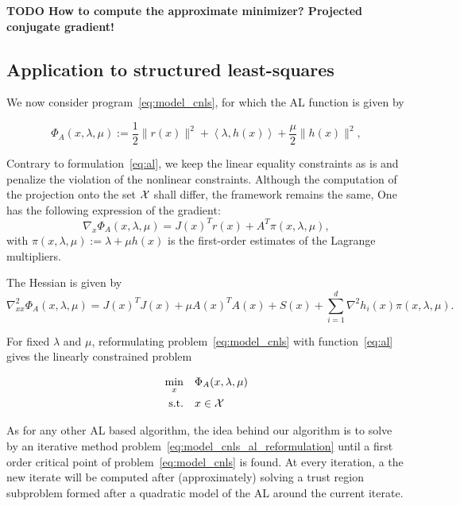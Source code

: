 \documentclass[10pt]{article}
\numberwithin{equation}{section}
\newcommand{\scal}[2]{\left\langle {#1} , {#2} \right\rangle} %
\begin{document}
	 \textbf{TODO How to compute the approximate minimizer? Projected conjugate gradient!}
	 \subsection{Application to structured least-squares}
	 
	 We now consider program~\eqref{eq:model_cnls}, for which the AL function is given by
	 
	 \begin{equation}
	 	\label{eq:lsal}
	 	\Phi_A(x,\lambda,\mu) := \dfrac{1}{2}\|r(x)\|^2 + \scal{\lambda}{h(x)} + \dfrac{\mu}{2} \|h(x)\|^2,
	 \end{equation}
	 
	 Contrary to formulation~\eqref{eq:al}, we keep the linear equality constraints as is and penalize the violation of the nonlinear constraints. Although the computation of the projection onto the set ${\mathcal{X}}$ shall differ, the framework remains the same, 
	 One has the following expression of the gradient: 
	 \begin{equation}
	 	\label{eq:al_grad}
	 	\nabla_x \Phi_A(x,\lambda,\mu) = J(x)^Tr(x) + A^T\pi(x,\lambda,\mu),
	 \end{equation}
	 with $\pi(x,\lambda,\mu):=\lambda + \mu h(x)$ is the first-order estimates of the Lagrange multipliers. 
	 
	 The Hessian is given by
	 \begin{equation}\label{eq:al_hessian}
	 	\nabla^2_{xx} \Phi_A(x,\lambda,\mu) = J(x)^TJ(x) + \mu A(x)^TA(x) +  S(x) + \sum_{i=1}^d \nabla^2 h_i(x) \pi(x,\lambda,\mu).
	 \end{equation}
	 
	 For fixed $\lambda$ and $\mu$, reformulating problem~\eqref{eq:model_cnls} with function~\eqref{eq:al} gives the linearly constrained problem
	 
	 \begin{equation}\label{eq:model_cnls_al_reformulation} 
	 	\begin{aligned}
	 		\min_{x} \quad& \Phi_A(x,\lambda,\mu)  \\
	 		\text{s.t.}  \quad & x \in {\mathcal{X}} 
	 	\end{aligned}	
	 \end{equation}
	 
	 As for any other AL based algorithm, the idea behind our algorithm is to solve by an iterative method problem~\eqref{eq:model_cnls_al_reformulation} until a first order critical point of problem~\eqref{eq:model_cnls} is found. At every iteration, a the new iterate will be computed after (approximately) solving a trust region subproblem formed after a quadratic model of the AL around the current iterate. 
	 
\end{document}
